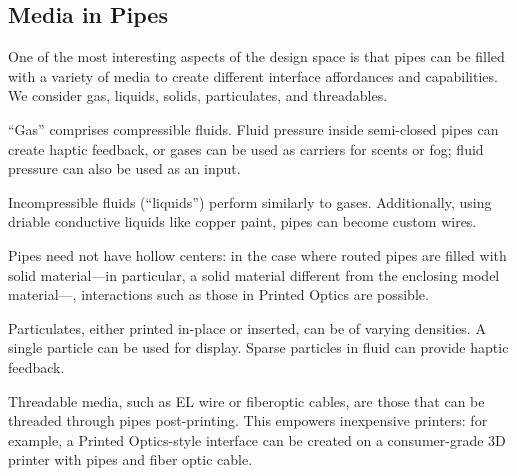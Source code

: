 \subsection{Media in Pipes}
One of the most interesting aspects of the design space is that pipes can be filled with a variety of media to create different interface affordances and capabilities. We consider gas, liquids, solids, particulates, and threadables.

``Gas'' comprises compressible fluids.  Fluid pressure inside semi-closed pipes can create haptic feedback, or gases can be used as carriers for scents or fog; fluid pressure can also be used as an input.

Incompressible fluids (``liquids'') perform similarly to gases.  Additionally, using driable conductive liquids like copper paint, pipes can become custom wires. 

Pipes need not have hollow centers: in the case where routed pipes are filled with solid material---in particular, a solid material different from the enclosing model material---, interactions such as those in Printed Optics \cite{Willis-printedoptics} are possible.

Particulates, either printed in-place or inserted, can be of varying densities.  A single particle can be used for display.  Sparse particles in fluid can provide haptic feedback.

Threadable media, such as EL wire or fiberoptic cables, are those that can be threaded through pipes post-printing.  This empowers inexpensive printers: for example, a Printed Optics-style interface can be created on a consumer-grade 3D printer with pipes and fiber optic cable.